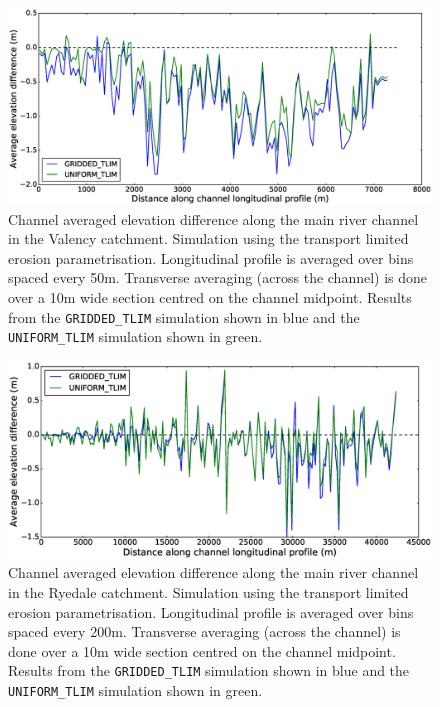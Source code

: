 \begin{figure}[htb]
\includegraphics[width=14cm]{chp06_figures_scripts/fig_swath_profile_boscastle_erode_tlim.eps}
\caption{Channel averaged elevation difference along the main river channel in the Valency catchment. Simulation using the transport limited erosion parametrisation. Longitudinal profile is averaged over bins spaced every 50m. Transverse averaging (across the channel) is done over a 10m wide section centred on the channel midpoint. Results from the \texttt{GRIDDED\_TLIM} simulation shown in blue and the \texttt{UNIFORM\_TLIM} simulation shown in green.}
\label{fig_boscastle_swath_tlim}
\end{figure}

\begin{figure}[htb]
\includegraphics[width=14cm]{chp06_figures_scripts/fig_swath_profile_ryedale_erode_tlim.eps}
\caption{Channel averaged elevation difference along the main river channel in the Ryedale catchment. Simulation using the transport limited erosion parametrisation. Longitudinal profile is averaged over bins spaced every 200m. Transverse averaging (across the channel) is done over a 10m wide section centred on the channel midpoint. Results from the \texttt{GRIDDED\_TLIM} simulation shown in blue and the \texttt{UNIFORM\_TLIM} simulation shown in green.}
\label{fig_ryedale_swath_tlim}
\end{figure}

